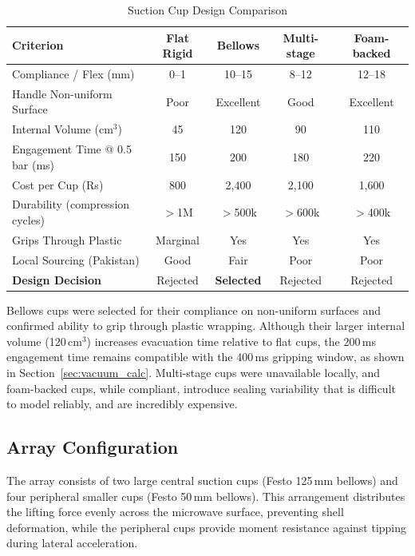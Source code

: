 \begin{table}[htbp]
    \centering
    \caption{Suction Cup Design Comparison}
    \label{tab:suction_cup_types}
    \begin{tabular}{l c c c c}
        \toprule
        \textbf{Criterion} & \textbf{Flat Rigid} & \textbf{Bellows} 
                           & \textbf{Multi-stage} & \textbf{Foam-backed} \\
                           \midrule
        Compliance / Flex (mm) & 0--1 & 10--15 & 8--12 & 12--18 \\
        Handle Non-uniform Surface & Poor & Excellent & Good & Excellent \\
        Internal Volume (cm\(^3\)) & 45 & 120 & 90 & 110 \\
        Engagement Time @ 0.5\,bar (ms) & 150 & 200 & 180 & 220 \\
        Cost per Cup (Rs) & 800 & 2,400 & 2,100 & 1,600 \\
        Durability (compression cycles) & \(>\)1M & \(>\)500k 
                                        & \(>\)600k & \(>\)400k \\
        Grips Through Plastic & Marginal & Yes & Yes & Yes \\
        Local Sourcing (Pakistan) & Good & Fair & Poor & Poor \\
        \textbf{Design Decision} & Rejected & \textbf{Selected} 
                                 & Rejected & Rejected \\
                                 \bottomrule
    \end{tabular}
\end{table}

Bellows cups were selected for their compliance on non-uniform surfaces and 
confirmed ability to grip through plastic wrapping. Although their larger 
internal volume (120\,cm$^3$) increases evacuation time relative to flat 
cups, the 200\,ms engagement time remains compatible with the 400\,ms 
gripping window, as shown in Section~\ref{sec:vacuum_calc}. Multi-stage 
cups were unavailable locally, and foam-backed cups, while compliant, 
introduce sealing variability that is difficult to model reliably, and are incredibly expensive. 

\subsection{Array Configuration}

The array consists of two large central suction cups (Festo 125\,mm bellows) 
and four peripheral smaller cups (Festo 50\,mm bellows). This arrangement 
distributes the lifting force evenly across the microwave surface, preventing 
shell deformation, while the peripheral cups provide moment resistance against 
tipping during lateral acceleration.

